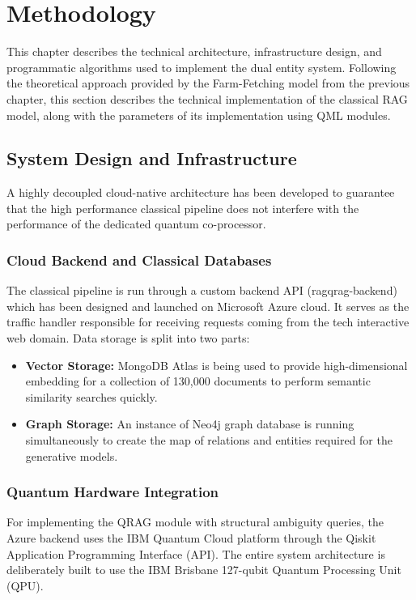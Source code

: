 \chapter{Methodology}

This chapter describes the technical architecture, infrastructure design, and programmatic algorithms used to implement the dual entity system. Following the theoretical approach provided by the Farm-Fetching model from the previous chapter, this section describes the technical implementation of the classical RAG model, along with the parameters of its implementation using QML modules.

\section{System Design and Infrastructure}

A highly decoupled cloud-native architecture has been developed to guarantee that the high performance classical pipeline does not interfere with the performance of the dedicated quantum co-processor.

\subsection{Cloud Backend and Classical Databases}
The classical pipeline is run through a custom backend API (ragqrag-backend) which has been designed and launched on Microsoft Azure cloud. It serves as the traffic handler responsible for receiving requests coming from the tech interactive web domain. Data storage is split into two parts:
\begin{itemize}
	\item \textbf{Vector Storage:} MongoDB Atlas is being used to provide high-dimensional embedding for a collection of 130,000 documents to perform semantic similarity searches quickly.
	\item \textbf{Graph Storage:} An instance of Neo4j graph database is running simultaneously to create the map of relations and entities required for the generative models.
\end{itemize}

\subsection{Quantum Hardware Integration}
For implementing the QRAG module with structural ambiguity queries, the Azure backend uses the IBM Quantum Cloud platform through the Qiskit Application Programming Interface (API). The entire system architecture is deliberately built to use the IBM Brisbane 127-qubit Quantum Processing Unit (QPU).

